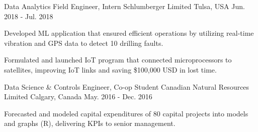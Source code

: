 \begin{cventries}
\cventry
{Data Analytics Field Engineer, Intern} %
{Schlumberger Limited} %
{Tulsa, USA} %
{Jun. 2018 - Jul. 2018} %
{
	\begin{cvitems} %
		\item {Developed ML application that ensured efficient operations by utilizing real-time vibration and GPS data to detect 10 drilling faults.}
		\item {Formulated and launched IoT program that connected microprocessors to satellites, improving IoT links and saving \$100,000 USD in lost time.}
	\end{cvitems}
}

\cventry
{Data Science \& Controls Engineer, Co-op Student} %
{Canadian Natural Resources Limited} %
{Calgary, Canada} %
{May. 2016 - Dec. 2016} %
{
	\begin{cvitems} %
		\item {Forecasted and modeled capital expenditures of 80 capital projects into models and graphs (R), delivering KPIs to senior management.}
	\end{cvitems}
}



\end{cventries}
